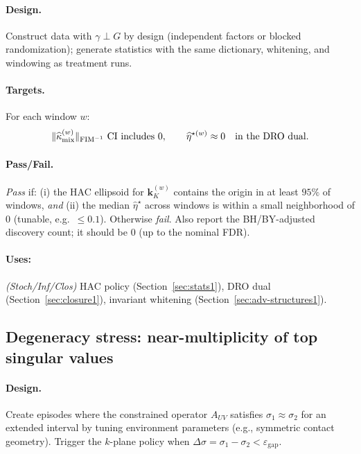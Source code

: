\paragraph{Design.} Construct data with $\gamma\perp G$ by design (independent factors or blocked randomization); generate statistics with the same dictionary, whitening, and windowing as treatment runs.

\paragraph{Targets.} For each window $w$:
\[
\|\widehat\kappa_{\mathrm{mix}}^{(w)}\|_{\FIM^{-1}}\ \text{CI includes }0,\qquad
\widehat\eta^{\star (w)}\approx 0\quad \text{in the DRO dual.}
\]

\paragraph{Pass/Fail.} \emph{Pass} if: (i) the HAC ellipsoid for $\mathbf k_K^{(w)}$ contains the origin in at least $95\%$ of windows, \emph{and} (ii) the median $\widehat\eta^\star$ across windows is within a small neighborhood of $0$ (tunable, e.g.\ $\le 0.1$). Otherwise \emph{fail}. Also report the BH/BY-adjusted discovery count; it should be $0$ (up to the nominal FDR).

\paragraph{Uses:} \textit{(Stoch/Inf/Clos)} HAC policy (Section~\ref{sec:stats1}), DRO dual (Section~\ref{sec:closure1}), invariant whitening (Section~\ref{sec:adv-structures1}).

\subsection{Degeneracy stress: near-multiplicity of top singular values}\label{subsec:degstress}

\paragraph{Design.} Create episodes where the constrained operator $A_{UV}$ satisfies $\sigma_1\approx\sigma_2$ for an extended interval by tuning environment parameters (e.g., symmetric contact geometry). Trigger the $k$-plane policy when $\Delta\sigma=\sigma_1-\sigma_2<\varepsilon_{\mathrm{gap}}$.

